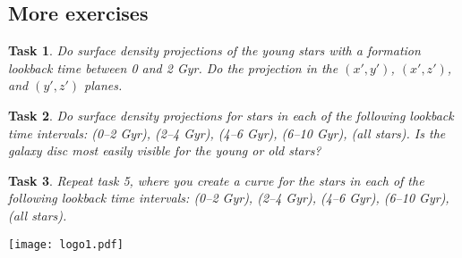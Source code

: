 \documentclass[11pt,a4paper]{article} %
\newtheorem{Exercise}{Task}
\begin{document}
\newpage
\subsection*{More exercises}


{\color{ForestGreen}
\begin{Exercise}
Do surface density projections of the young stars with a formation lookback time between 0 and 2 Gyr. Do the projection in the $(x',y')$, $(x',z')$, and $(y',z')$ planes.
\end{Exercise}
}


{\color{ForestGreen}
\begin{Exercise}
Do surface density projections for stars in each of the following lookback time intervals: (0--2 Gyr), (2--4 Gyr), (4--6 Gyr), (6--10 Gyr), (all stars). Is the galaxy disc most easily visible for the young or old stars?
\end{Exercise}
}

{\color{ForestGreen}
\begin{Exercise}
Repeat task 5, where you create a curve for the stars in each of the following lookback time intervals: (0--2 Gyr), (2--4 Gyr), (4--6 Gyr), (6--10 Gyr), (all stars).
\end{Exercise}
}



\begin{flushright}
\texttt{[image: logo1.pdf]}
\end{flushright}


\def\aj{AJ}
\def\araa{ARA\&A}
\def\apj{ApJ}
\def\apjl{ApJ}
\def\apjs{ApJS}
\def\apss{Ap\&SS}
\def\aap{A\&A}
\def\aapr{A\&A~Rev.}
\def\aaps{A\&AS}
\def\mnras{MNRAS}
\def\nat{Nature}
\def\pasp{PASP}
\def\aplett{Astrophys.~Lett.}
\def\physrep{Physical Reviews}
\def\nar{New A Rev.}

%
%





\label{lastpage}
\end{document}
